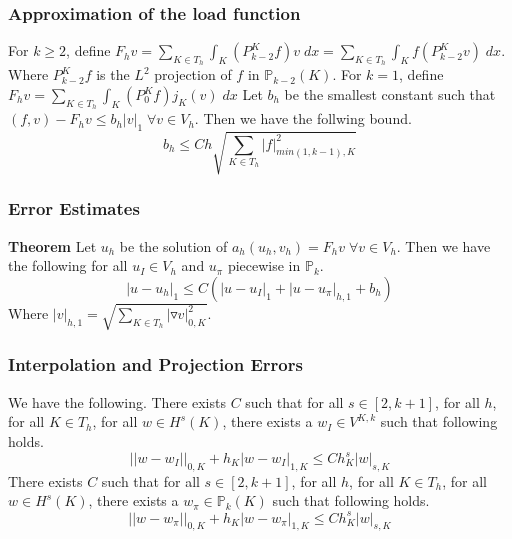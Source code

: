 \documentclass{beamer}
\begin{document}
\begin{frame}
\frametitle{Approximation of the load function}
For $k\ge 2$, define $F_h v=\sum\limits_{K\in T_h}\int_K(P_{k-2}^K f)v\;dx=\sum\limits_{K\in T_h}\int_K f(P_{k-2}^K v)\;dx$.
\linebreak
Where $P_{k-2}^K f$ is the $L^2$ projection of $f$ in $\mathbb{P}_{k-2}(K)$.
\linebreak\linebreak
For $k=1$, define $F_h v=\sum\limits_{K\in T_h}\int_K(P_0^K f)j_K(v)\;dx$
\linebreak\linebreak
Let $b_h$ be the smallest constant such that $(f,v)-F_hv\le b_h |v|_1\;\forall v \in V_h$.
\linebreak
Then we have the follwing bound.
$$b_h\le Ch\sqrt{\sum\limits_{K\in T_h}|f|_{min(1,k-1),K}^2}$$
\end{frame}

\begin{frame}
\frametitle{Error Estimates}
\textbf{Theorem} Let $u_h$ be the solution of $a_h(u_h,v_h)=F_h v\;\forall v \in V_h$. Then we have the following for all $u_I\in V_h$ and $u_{\pi}$ piecewise in $\mathbb{P}_k$.
$$
|u-u_h|_1\le C(|u-u_I|_1 + |u-u_{\pi}|_{h,1} + b_h)
$$
Where $|v|_{h,1}=\sqrt{\sum\limits_{K\in T_h}|\triangledown v|_{0,K}^2}$.
\end{frame}

\begin{frame}
\frametitle{Interpolation and Projection Errors}
We have the following.\linebreak\linebreak
There exists $C$ such that for all $s\in[2,k+1]$, for all $h$, for all $K\in T_h$, for all $w \in H^s(K)$, there exists a $w_I \in V^{K,k}$ such that following holds.
$$||w-w_I||_{0,K}+h_K|w-w_I|_{1,K}\le C h_K^s |w|_{s,K}$$
\linebreak\linebreak
There exists $C$ such that for all $s\in[2,k+1]$, for all $h$, for all $K\in T_h$, for all $w \in H^s(K)$, there exists a $w_{\pi} \in \mathbb{P}_k(K)$ such that following holds.
$$||w-w_{\pi}||_{0,K}+h_K|w-w_{\pi}|_{1,K}\le C h_K^s |w|_{s,K}$$
\end{frame}

\end{document}
